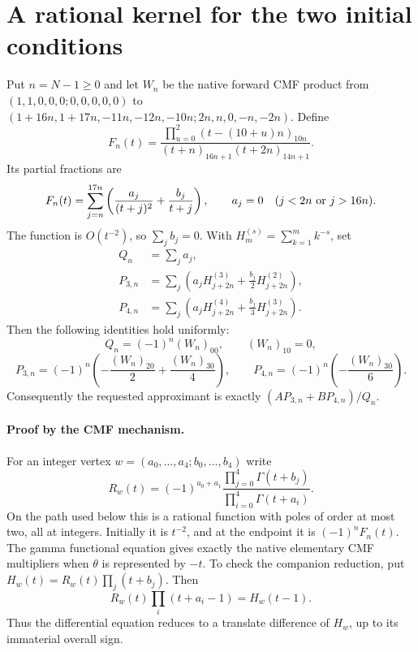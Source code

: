 \section{A rational kernel for the two initial conditions}
Put $n=N-1\ge0$ and let $W_n$ be the native forward CMF product from
$(1,1,0,0,0;0,0,0,0,0)$ to
$(1+16n,1+17n,-11n,-12n,-10n;2n,n,0,-n,-2n)$.
Define
\[
 F_n(t)=\frac{\prod_{u=0}^2(t-(10+u)n)_{10n}}
 {(t+n)_{16n+1}(t+2n)_{14n+1}}.
\]
Its partial fractions are
\[
 F_n(t)=\sum_{j=n}^{17n}\left(\frac{a_j}{(t+j)^2}
                    +\frac{b_j}{t+j}\right),\qquad
 a_j=0\quad(j<2n\ \hbox{or}\ j>16n).
\]
The function is $O(t^{-2})$, so $\sum_jb_j=0$.
With $H_m^{(s)}=\sum_{k=1}^m k^{-s}$, set
\begin{align*}
 Q_n&=\sum_j a_j,\\
 P_{3,n}&=\sum_j\left(a_jH_{j+2n}^{(3)}+
                              \frac{b_j}{2}H_{j+2n}^{(2)}\right),\\
 P_{4,n}&=\sum_j\left(a_jH_{j+2n}^{(4)}+
                              \frac{b_j}{3}H_{j+2n}^{(3)}\right).
\end{align*}
Then the following identities hold uniformly:
\[
 Q_n=(-1)^n(W_n)_{00},\qquad (W_n)_{10}=0,
\]
\[
 P_{3,n}=(-1)^n\left(-\frac{(W_n)_{20}}2+
                              \frac{(W_n)_{30}}4\right),\qquad
 P_{4,n}=(-1)^n\left(-\frac{(W_n)_{30}}6\right).
\]
Consequently the requested approximant is exactly
$(A P_{3,n}+B P_{4,n})/Q_n$.

\paragraph{Proof by the CMF mechanism.}
For an integer vertex $w=(a_0,\ldots,a_4;b_0,\ldots,b_4)$ write
\[
 R_w(t)=(-1)^{a_0+a_1}
       \frac{\prod_{j=0}^4\Gamma(t+b_j)}
            {\prod_{i=0}^4\Gamma(t+a_i)}.
\]
On the path used below this is a rational function with poles of order at
most two, all at integers.  Initially it is $t^{-2}$, and at the endpoint
it is $(-1)^nF_n(t)$.  The gamma functional equation gives exactly the
native elementary CMF multipliers when $\theta$ is represented by $-t$.
To check the companion reduction, put
$H_w(t)=R_w(t)\prod_j(t+b_j)$.  Then
\[
 R_w(t)\prod_i(t+a_i-1)=H_w(t-1).
\]
Thus the differential equation reduces to a translate difference of
$H_w$, up to its immaterial overall sign.

